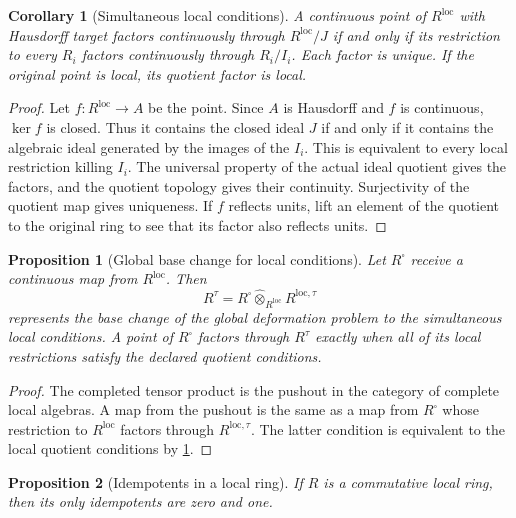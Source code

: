 \documentclass[11pt]{amsart}
\newtheorem{proposition}[proposition]{Proposition}
\newtheorem{corollary}[corollary]{Corollary}
\theoremstyle{definition}
\theoremstyle{remark}
\newcommand{\wideotimes}{\mathbin{\widehat\otimes}}
\begin{document}
\begin{corollary}[Simultaneous local conditions]\label{cor:simultaneous_local}
A continuous point of \(R^{\mathrm{loc}}\) with Hausdorff target factors continuously through \(R^{\mathrm{loc}}/J\) if and only if its restriction to every \(R_i\) factors continuously through \(R_i/I_i\). Each factor is unique. If the original point is local, its quotient factor is local.
\end{corollary}

\begin{proof}
Let \(f:R^{\mathrm{loc}}\to A\) be the point. Since \(A\) is Hausdorff and \(f\) is continuous, \(\ker f\) is closed. Thus it contains the closed ideal \(J\) if and only if it contains the algebraic ideal generated by the images of the \(I_i\). This is equivalent to every local restriction killing \(I_i\). The universal property of the actual ideal quotient gives the factors, and the quotient topology gives their continuity. Surjectivity of the quotient map gives uniqueness. If \(f\) reflects units, lift an element of the quotient to the original ring to see that its factor also reflects units.
\end{proof}

\begin{proposition}[Global base change for local conditions]\label{prop:global_local_basechange}
Let \(R^\square\) receive a continuous map from \(R^{\mathrm{loc}}\). Then
\[
R^{\tau}
=
R^\square\wideotimes_{R^{\mathrm{loc}}}R^{\mathrm{loc},\tau}
\]
represents the base change of the global deformation problem to the simultaneous local conditions. A point of \(R^\square\) factors through \(R^{\tau}\) exactly when all of its local restrictions satisfy the declared quotient conditions.
\end{proposition}

\begin{proof}
The completed tensor product is the pushout in the category of complete local algebras. A map from the pushout is the same as a map from \(R^\square\) whose restriction to \(R^{\mathrm{loc}}\) factors through \(R^{\mathrm{loc},\tau}\). The latter condition is equivalent to the local quotient conditions by \cref{cor:simultaneous_local}.
\end{proof}

\begin{proposition}[Idempotents in a local ring]\label{prop:local_idempotent}
If \(R\) is a commutative local ring, then its only idempotents are zero and one.
\end{proposition}
\end{document}
